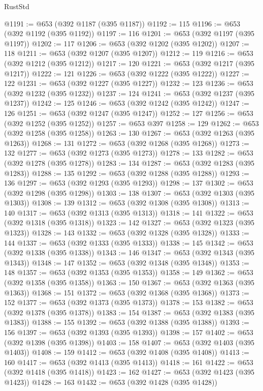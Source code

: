 \begin{lexlean}{RustStd}
\begin{coremodule}
{\begin{coremodule}
{{{{{{{{{{{{@1191 := @653 (@392 @1187 (@395 @1187))
@1192 := 115
@1196 := @653 (@392 @1192 (@395 @1192))
@1197 := 116
@1201 := @653 (@392 @1197 (@395 @1197))
@1202 := 117
@1206 := @653 (@392 @1202 (@395 @1202))
@1207 := 118
@1211 := @653 (@392 @1207 (@395 @1207))
@1212 := 119
@1216 := @653 (@392 @1212 (@395 @1212))
@1217 := 120
@1221 := @653 (@392 @1217 (@395 @1217))
@1222 := 121
@1226 := @653 (@392 @1222 (@395 @1222))
@1227 := 122
@1231 := @653 (@392 @1227 (@395 @1227))
@1232 := 123
@1236 := @653 (@392 @1232 (@395 @1232))
@1237 := 124
@1241 := @653 (@392 @1237 (@395 @1237))
@1242 := 125
@1246 := @653 (@392 @1242 (@395 @1242))
@1247 := 126
@1251 := @653 (@392 @1247 (@395 @1247))
@1252 := 127
@1256 := @653 (@392 @1252 (@395 @1252))
@1257 := @653 @397
@1258 := 129
@1262 := @653 (@392 @1258 (@395 @1258))
@1263 := 130
@1267 := @653 (@392 @1263 (@395 @1263))
@1268 := 131
@1272 := @653 (@392 @1268 (@395 @1268))
@1273 := 132
@1277 := @653 (@392 @1273 (@395 @1273))
@1278 := 133
@1282 := @653 (@392 @1278 (@395 @1278))
@1283 := 134
@1287 := @653 (@392 @1283 (@395 @1283))
@1288 := 135
@1292 := @653 (@392 @1288 (@395 @1288))
@1293 := 136
@1297 := @653 (@392 @1293 (@395 @1293))
@1298 := 137
@1302 := @653 (@392 @1298 (@395 @1298))
@1303 := 138
@1307 := @653 (@392 @1303 (@395 @1303))
@1308 := 139
@1312 := @653 (@392 @1308 (@395 @1308))
@1313 := 140
@1317 := @653 (@392 @1313 (@395 @1313))
@1318 := 141
@1322 := @653 (@392 @1318 (@395 @1318))
@1323 := 142
@1327 := @653 (@392 @1323 (@395 @1323))
@1328 := 143
@1332 := @653 (@392 @1328 (@395 @1328))
@1333 := 144
@1337 := @653 (@392 @1333 (@395 @1333))
@1338 := 145
@1342 := @653 (@392 @1338 (@395 @1338))
@1343 := 146
@1347 := @653 (@392 @1343 (@395 @1343))
@1348 := 147
@1352 := @653 (@392 @1348 (@395 @1348))
@1353 := 148
@1357 := @653 (@392 @1353 (@395 @1353))
@1358 := 149
@1362 := @653 (@392 @1358 (@395 @1358))
@1363 := 150
@1367 := @653 (@392 @1363 (@395 @1363))
@1368 := 151
@1372 := @653 (@392 @1368 (@395 @1368))
@1373 := 152
@1377 := @653 (@392 @1373 (@395 @1373))
@1378 := 153
@1382 := @653 (@392 @1378 (@395 @1378))
@1383 := 154
@1387 := @653 (@392 @1383 (@395 @1383))
@1388 := 155
@1392 := @653 (@392 @1388 (@395 @1388))
@1393 := 156
@1397 := @653 (@392 @1393 (@395 @1393))
@1398 := 157
@1402 := @653 (@392 @1398 (@395 @1398))
@1403 := 158
@1407 := @653 (@392 @1403 (@395 @1403))
@1408 := 159
@1412 := @653 (@392 @1408 (@395 @1408))
@1413 := 160
@1417 := @653 (@392 @1413 (@395 @1413))
@1418 := 161
@1422 := @653 (@392 @1418 (@395 @1418))
@1423 := 162
@1427 := @653 (@392 @1423 (@395 @1423))
@1428 := 163
@1432 := @653 (@392 @1428 (@395 @1428))
}}}}}}}}}}}}
\end{coremodule}}
\end{coremodule}
\end{lexlean}
